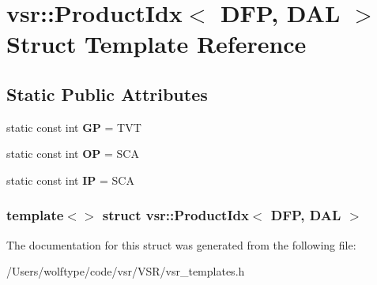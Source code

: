 \hypertarget{structvsr_1_1_product_idx_3_01_d_f_p_00_01_d_a_l_01_4}{\section{vsr\-:\-:Product\-Idx$<$ D\-F\-P, D\-A\-L $>$ Struct Template Reference}
\label{structvsr_1_1_product_idx_3_01_d_f_p_00_01_d_a_l_01_4}
}
\subsection*{Static Public Attributes}
\begin{DoxyCompactItemize}
\item 
\hypertarget{structvsr_1_1_product_idx_3_01_d_f_p_00_01_d_a_l_01_4_ab02c7ddbe6b982b2bbdf0a53c2f7e8a9}{static const int {\bfseries G\-P} = T\-V\-T}\label{structvsr_1_1_product_idx_3_01_d_f_p_00_01_d_a_l_01_4_ab02c7ddbe6b982b2bbdf0a53c2f7e8a9}

\item 
\hypertarget{structvsr_1_1_product_idx_3_01_d_f_p_00_01_d_a_l_01_4_a0504ce49db0e7f04caa564bd6e0b99d5}{static const int {\bfseries O\-P} = S\-C\-A}\label{structvsr_1_1_product_idx_3_01_d_f_p_00_01_d_a_l_01_4_a0504ce49db0e7f04caa564bd6e0b99d5}

\item 
\hypertarget{structvsr_1_1_product_idx_3_01_d_f_p_00_01_d_a_l_01_4_aec456719183701a186bfbe7afc729752}{static const int {\bfseries I\-P} = S\-C\-A}\label{structvsr_1_1_product_idx_3_01_d_f_p_00_01_d_a_l_01_4_aec456719183701a186bfbe7afc729752}

\end{DoxyCompactItemize}
\subsubsection*{template$<$$>$ struct vsr\-::\-Product\-Idx$<$ D\-F\-P, D\-A\-L $>$}



The documentation for this struct was generated from the following file\-:\begin{DoxyCompactItemize}
\item 
/\-Users/wolftype/code/vsr/\-V\-S\-R/vsr\-\_\-templates.\-h\end{DoxyCompactItemize}

